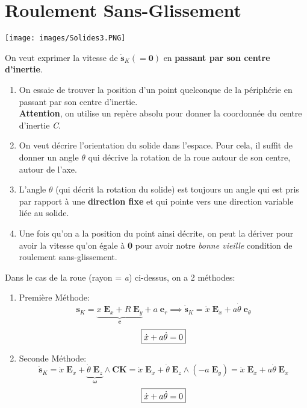 \documentclass[a4paper]{article}
\begin{document}
\section{Roulement Sans-Glissement}





\begin{center} \texttt{[image: images/Solides3.PNG]} \end{center}

On veut exprimer la vitesse de $ \dot{\textbf{s}}_K ( = \textbf{0}) $ en \textbf{passant par son centre d'inertie}.
\begin{enumerate}

\item On essaie de trouver la position d'un point quelconque de la périphérie en passant par son centre d'inertie. \\
\textbf{Attention}, on utilise un repère absolu pour donner la coordonnée du centre d'inertie \emph{C}.

\item On veut décrire l'orientation du solide dans l'espace. Pour cela, il suffit de donner un angle $ \theta $ qui décrive la rotation de la roue autour de son centre, autour de l'axe.

\item L'angle $ \theta $ (qui décrit la rotation du solide) est toujours un angle qui est pris par rapport à une \textbf{direction fixe} et qui pointe vers une direction variable liée au solide.

\item Une fois qu'on a la position du point ainsi décrite, on peut la dériver pour avoir la vitesse qu'on égale à \textbf{0} pour avoir notre \emph{bonne vieille} condition de roulement sans-glissement.

\end{enumerate}


Dans le cas de la roue (rayon = \emph{a}) ci-dessus, on a 2 méthodes: 
\begin{enumerate}[label=(\Alph*)]
\item Première Méthode:
\[ \textbf{s}_K = \underbrace{x \; \textbf{E}_x + R \; \textbf{E}_y}_{\textbf{c}} + a \; \textbf{e}_r \implies \dot{\textbf{s}}_K = \dot{x} \; \textbf{E}_x + a \dot{\theta} \; \textbf{e}_\theta \]
\[ \fbox{$ \dot{x} + a \dot{\theta} = 0 $} \]
\item Seconde Méthode:
\[ \dot{\textbf{s}}_K = \dot{x} \; \textbf{E}_x + \underbrace{\dot{\theta} \; \textbf{E}_z}_{\boldsymbol{\omega}} \wedge \textbf{CK} = \dot{x} \; \textbf{E}_x + \dot{\theta} \; \textbf{E}_z \wedge (- a \; \textbf{E}_y) = \dot{x} \; \textbf{E}_x + a \dot{\theta} \; \textbf{E}_x \]
\[ \fbox{$ \dot{x} + a \dot{\theta} = 0 $} \]

\end{enumerate}
\end{document}
